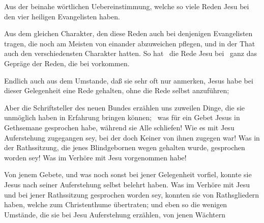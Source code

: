 \begin{aufzb}
\item Aus der beinahe wörtlichen Uebereinstimmung, welche so viele Reden Jesu bei den vier heiligen Evangelisten haben.
\item Aus dem gleichen Charakter, den diese Reden auch bei denjenigen Evangelisten tragen, die noch am Meisten von einander abzuweichen pflegen, und in der That auch den verschiedensten Charakter hatten. So hat \zB\ die Rede Jesu bei \ ganz das Gepräge der Reden, die bei  vorkommen.
\item Endlich auch aus dem Umstande, daß sie sehr oft nur anmerken, Jesus habe bei dieser Gelegenheit eine Rede gehalten, ohne die Rede selbst anzuführen; \zB\ \ \ \ \ \uam
\end{aufzb}\par
{} Aber die Schriftsteller des neuen Bundes erzählen uns zuweilen Dinge, die sie unmöglich haben in Erfahrung bringen können; \zB\ was für ein Gebet Jesus in Gethsemane gesprochen habe, während sie Alle schliefen! Wie es mit Jesu Auferstehung zugegangen sey, bei der doch Keiner von ihnen zugegen war! Was in der Rathssitzung, die jenes Blindgebornen wegen gehalten wurde, gesprochen worden sey! Was  im Verhöre mit Jesu vorgenommen habe! \usw\par
{} Von jenem Gebete, und was noch sonst bei jener Gelegenheit vorfiel, konnte sie Jesus nach seiner Auferstehung selbst belehrt haben. Was im Verhöre mit Jesu und bei jener Rathssitzung gesprochen worden sey, konnten sie von Rathsgliedern haben, welche zum Christenthume übertraten; und eben so die wenigen Umstände, die sie bei Jesu Auferstehung erzählen, von jenen Wächtern \usw


